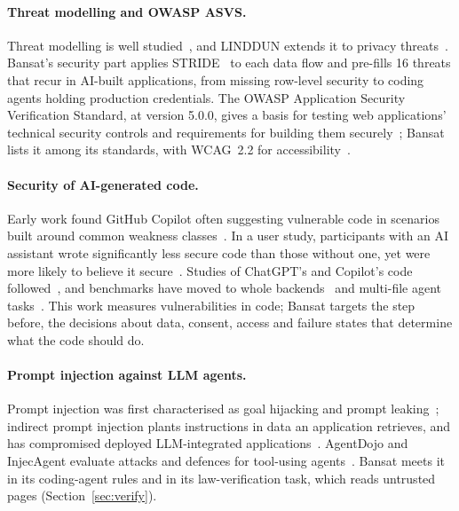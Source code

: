 \documentclass[11pt,a4paper]{article}
\begin{document}
\paragraph{Threat modelling and OWASP ASVS.}
Threat modelling is well studied~\cite{xiong2019threat}, and LINDDUN extends it to privacy threats~\cite{deng2011linddun}.
Bansat's security part applies STRIDE~\cite{shostack2014threat}
to each data flow and pre-fills 16 threats that recur in AI-built applications, from missing row-level security to
coding agents holding production credentials. The OWASP Application Security Verification Standard, at version 5.0.0,
gives a basis for testing web applications' technical security controls and requirements for building them
securely~\cite{owaspasvs}; Bansat lists it among its standards, with WCAG~2.2 for accessibility~\cite{wcag22}.

\paragraph{Security of AI-generated code.}
Early work found GitHub Copilot often suggesting vulnerable code in scenarios built around common weakness
classes~\cite{pearce2022asleep}. In a user study, participants with an AI assistant wrote significantly less secure code
than those without one, yet were more likely to believe it secure~\cite{perry2023insecure}. Studies of ChatGPT's and Copilot's code followed~\cite{khoury2023chatgpt,fu2025copilot}, and benchmarks have moved to
whole backends~\cite{vero2025baxbench} and multi-file agent tasks~\cite{zhao2025susvibes}. This work measures vulnerabilities in code; Bansat targets the step before, the decisions
about data, consent, access and failure states that determine what the code should do.

\paragraph{Prompt injection against LLM agents.}
Prompt injection was first characterised as goal hijacking and prompt leaking~\cite{perez2022ignore}; indirect prompt
injection plants instructions in data an application retrieves, and has compromised deployed LLM-integrated
applications~\cite{greshake2023signedup}. AgentDojo and InjecAgent evaluate attacks and defences for tool-using
agents~\cite{debenedetti2024agentdojo,zhan2024injecagent}. Bansat meets it in its coding-agent rules and in its
law-verification task, which reads untrusted pages (Section~\ref{sec:verify}).
\end{document}
